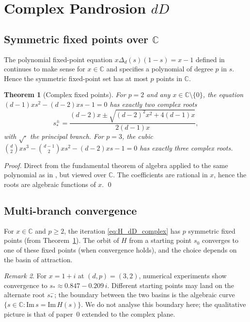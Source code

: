 \documentclass[11pt,a4paper]{article}
\newtheorem{theorem}{Theorem}
\theoremstyle{definition}
\theoremstyle{remark}
\newtheorem{remark}[theorem]{Remark}
\newcommand{\C}{\mathbb{C}}
\begin{document}
\section{Complex Pandrosion $dD$}

\subsection{Symmetric fixed points over $\C$}

The polynomial fixed-point equation $x \Delta_d(s)(1-s) = x-1$ defined
in \cite{1pandrosion_dD} continues to make sense for $x \in \C$ and
specifies a polynomial of degree $p$ in $s$.  Hence the symmetric
fixed-point set has at most $p$ points in $\C$.

\begin{theorem}[Complex fixed points]
\label{thm:complex_fp}
For $p = 2$ and any $x \in \C \setminus \{0\}$, the equation
$(d-1) x s^2 - (d-2) x s - 1 = 0$ has exactly two complex roots
\begin{equation}
  s_*^{\pm} = \frac{(d-2) x \pm \sqrt{(d-2)^2 x^2 + 4(d-1) x}}{2(d-1) x},
\end{equation}
with $\sqrt{\cdot}$ the principal branch.  For $p = 3$, the cubic
$\binom{d}{2} x s^3 - \binom{d-1}{2} x s^2 - (d-2) x s - 1 = 0$ has
exactly three complex roots.
\end{theorem}

\begin{proof}
Direct from the fundamental theorem of algebra applied to the same
polynomial as in \cite{1pandrosion_dD}, but viewed over $\C$.  The
coefficients are rational in $x$, hence the roots are algebraic
functions of $x$. \qed
\end{proof}

\subsection{Multi-branch convergence}

For $x \in \C$ and $p \geq 2$, the iteration
\eqref{eq:H_dD_complex} has $p$ symmetric fixed points (from
Theorem~\ref{thm:complex_fp}).  The orbit of $H$ from a starting point
$s_0$ converges to one of these fixed points (when convergence holds),
and the choice depends on the basin of attraction.

\begin{remark}
For $x = 1 + i$ at $(d, p) = (3, 2)$, numerical experiments show
convergence to $s_* \approx 0.847 - 0.209\, i$.  Different starting
points may land on the alternate root $s_*^{-}$; the boundary between
the two basins is the algebraic curve
$\{s \in \C : \text{Im}\, s = \text{Im}\, H(s)\}$.  We do not analyse
this boundary here; the qualitative picture is that of paper~0
\cite{0pandrosion_pth} extended to the complex plane.
\end{remark}
\end{document}
